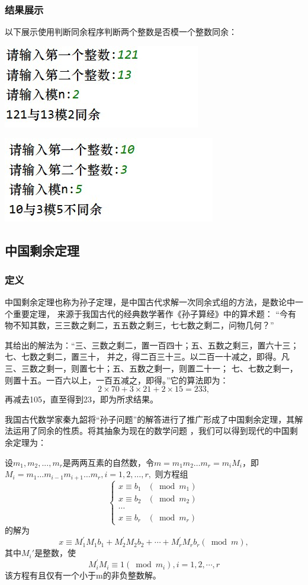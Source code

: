 \documentclass[UTF8]{ctexart}
\begin{document}
\subsubsection{结果展示}
\par 以下展示使用判断同余程序判断两个整数是否模一个整数同余：\\
\par 
\includegraphics[width=.4\textwidth]{3.1.jpg}\\
\par 
\includegraphics[width=.4\textwidth]{3.2.jpg}
\subsection{中国剩余定理}
\subsubsection{定义}
\par 中国剩余定理也称为孙子定理，是中国古代求解一次同余式组的方法，是数论中一个重要定理，
来源于我国古代的经典数学著作《孙子算经》中的算术题：
“今有物不知其数，三三数之剩二，五五数之剩三，七七数之剩二，问物几何？”
\par 其给出的解法为：“三、三数之剩二，置一百四十；五、五数之剩三，置六十三；七、七数之剩二，置三十，
并之，得二百三十三。以二百一十减之，即得。凡三、三数之剩一，则置七十；五、五数之剩一，则置二十一；
七、七数之剩一，则置十五。一百六以上，一百五减之，即得。”它的算法即为：
\[2 \times 70+3 \times 21+2 \times 15=233,\]再减去105，直至得到23，即为所求结果。
\par 我国古代数学家秦九韶将“孙子问题”的解答进行了推广形成了中国剩余定理，其解法运用了同余的性质。将其抽象为现在的数学问题
，我们可以得到现代的中国剩余定理为：
\par 设$m_1,m_2,...,m_r$是两两互素的自然数，令$m=m_1m_2\dots m_r=m_iM_i$，即$M_i=m_1\dots m_{i-1}m_{i+1}\dots m_r,i=1,2,\dots,r,$
则方程组
\begin{equation}
  \begin{cases}x \equiv b_{1} & \left(\bmod m_{1}\right) \\ x \equiv b_{2} & \left(\bmod m_{2}\right) \\ \cdots & \\ x \equiv b_{r} & \left(\bmod m_{r}\right)\end{cases}
\end{equation}
的解为
\[x \equiv M_{1}^{\prime} M_{1} b_{1}+M_{2}^{\prime} M_{2} b_{2}+\cdots+M_{r}^{\prime} M_{r} b_{r}(\bmod m),\]
其中$M_i'$是整数，使\[M_{i}^{\prime} M_{i} \equiv 1\left(\bmod m_{i}\right), i=1,2, \cdots, r\]
该方程有且仅有一个小于m的非负整数解。
\end{document}
